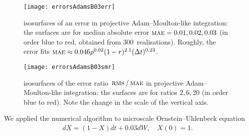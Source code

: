 \documentclass[12pt,reqno, a4paper]{article}
\numberwithin{equation}{section}
\newcommand{\err}{\operatorname{\textsc{mae}}}%
\newcommand{\rms}{\operatorname{\textsc{rms}}}%
\begin{document}
\begin{figure}
\centering
\texttt{[image: errorsAdamsB03err]}
\\
\parbox[b]{0.45\linewidth}{
\caption{isosurfaces of an error in projective Adam--Moulton-like integration: the surfaces are for median absolute error $\err=0.01,0.02,0.03$ (in order blue to red, obtained from $300$~realisations).    Roughly, the error fits $\err\approx 0.046\rho^{0.02}(1-r)^{2.1}(\Delta t)^{0.23}$.}
\label{fig:errorsAdamsB03err}}
\end{figure}

\begin{figure}
\centering
\texttt{[image: errorsAdamsB03smr]}
\\
\parbox[b]{0.45\linewidth}{
\caption{isosurfaces of the error ratio~$\rms /\err$ in projective Adam--Moulton-like integration: the surfaces are for ratios $2,6,20$ (in order blue to red). Note the change in the scale of the vertical axis.}
\label{fig:errorsAdamsB03smr}}
\end{figure}


We applied  the  numerical algorithm  to microscale Ornstein--Uhlenbeck equation
\begin{eqnarray}\label{eq:egsde}
dX=(1-X)dt+0.03dW,  \quad X(0)=1.
\end{eqnarray}
\end{document}
